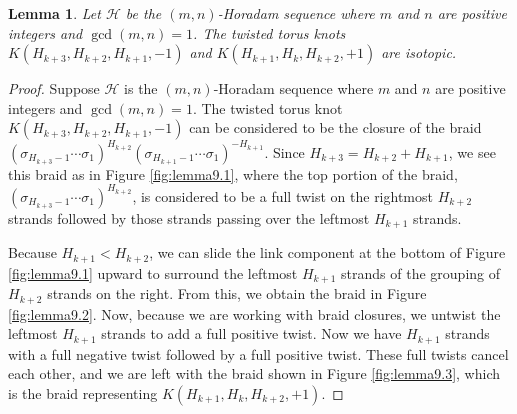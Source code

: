\documentclass{amsart}
\newtheorem{lemma}{Lemma}
\begin{document}
\begin{lemma}\label{lem:type6istype3}
Let $\mathcal H$ be the $(m,n)$-Horadam sequence where $m$ and $n$ are positive integers and $\gcd(m,n) = 1$. The twisted torus knots $K(H_{k+3}, H_{k+2}, H_{k+1}, -1)$ and $K(H_{k+1}, H_k, H_{k+2}, +1)$ are isotopic. 
\end{lemma}

\begin{proof}
Suppose $\mathcal H$ is the $(m,n)$-Horadam sequence where $m$ and $n$ are positive integers and $\gcd(m,n) = 1$. The twisted torus knot $K(H_{k+3}, H_{k+2}, H_{k+1}, -1)$ can be considered to be the closure of the braid $(\sigma_{H_{k+3} - 1} \cdots \sigma_1)^{H_{k+2}}(\sigma_{H_{k+1}-1} \cdots \sigma_1)^{-H_{k+1}}$. Since $H_{k+3} = H_{k+2}+ H_{k+1}$, we see this braid as in Figure \ref{fig:lemma9.1}, where the top portion of the braid, $(\sigma_{H_{k+3} - 1} \cdots \sigma_1)^{H_{k+2}}$, is considered to be a full twist on the rightmost $H_{k+2}$ strands followed by those strands passing over the leftmost $H_{k+1}$ strands.

Because $H_{k+1} < H_{k+2}$, we can slide the link component at the bottom of Figure \ref{fig:lemma9.1} upward to surround the leftmost $H_{k+1}$ strands of the grouping of $H_{k+2}$ strands on the right. From this, we obtain the braid in Figure \ref{fig:lemma9.2}. Now, because we are working with braid closures, we untwist the leftmost $H_{k+1}$ strands to add a full positive twist. Now we have $H_{k+1}$ strands with a full negative twist followed by a full positive twist. These full twists cancel each other, and we are left with the braid shown in Figure \ref{fig:lemma9.3}, which is the braid representing $K(H_{k+1}, H_k, H_{k+2}, +1)$.
\end{proof}
\end{document}
